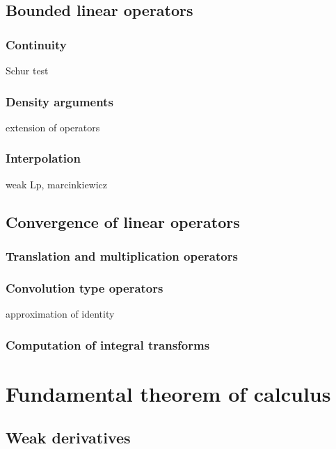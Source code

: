 \documentclass{../note}
\begin{document}
\chapter{Bounded linear operators}
\section{Continuity}
Schur test

\section{Density arguments}
extension of operators

\section{Interpolation}
weak Lp, marcinkiewicz




\chapter{Convergence of linear operators}
\section{Translation and multiplication operators}

\section{Convolution type operators}
approximation of identity

\section{Computation of integral transforms}











\part{Fundamental theorem of calculus}

\chapter{Weak derivatives}
\end{document}
